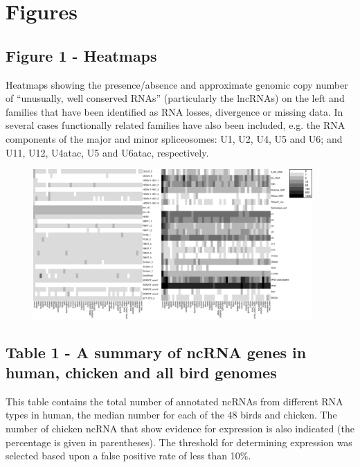 \documentclass[10pt]{bmc_article}
\newenvironment{bmcformat}{\begin{raggedright}\baselineskip20pt\sloppy\setboolean{publ}{false}}{\end{raggedright}\baselineskip20pt\sloppy}
\begin{document}
\begin{bmcformat}
{
  } %


\clearpage
\newpage

\section*{Figures}
  \subsection*{Figure 1 - Heatmaps}

Heatmaps showing the presence/absence and approximate genomic copy
number of ``unusually, well conserved RNAs'' (particularly the
lncRNAs) on the left and families that have been identified as
RNA losses, divergence or missing data. In several cases
functionally related families have also been included, e.g. the RNA
components of the major and minor spliceosomes: U1, U2, U4, U5 and U6;
and U11, U12, U4atac, U5 and U6atac, respectively.\label{fig:1}

 \begin{figure}[ht]
   \centering
   \includegraphics[width=0.95\textwidth]{figures/figure1.pdf}
 \end{figure}


\clearpage
\newpage

  \subsection*{Table 1 - A summary of ncRNA genes in human, chicken and all bird genomes}

This table contains the total number of annotated ncRNAs from
different RNA types in human, the median number for each of the 48
birds and chicken. The number of chicken ncRNA that show evidence for
expression is also indicated (the percentage is given in parentheses).
The threshold for determining expression was selected based upon a
false positive rate of less than 10\%.\label{table:1}


\end{bmcformat}
\end{document}
